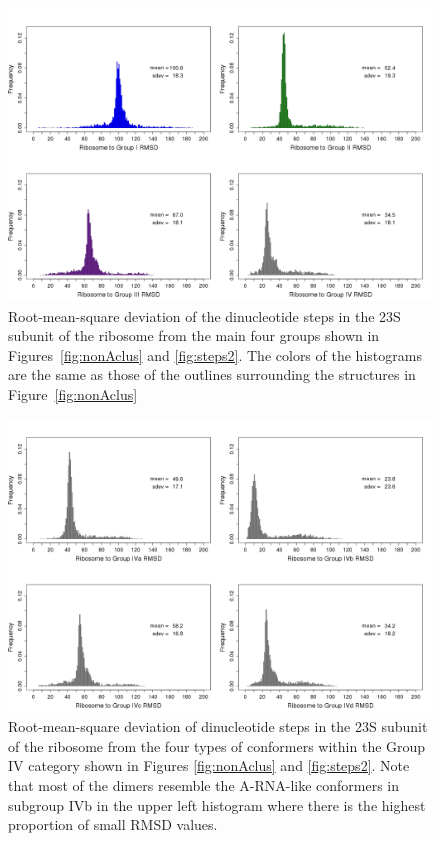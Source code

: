 \begin{figure}[htbp]
 \centering
\includegraphics[angle=90, scale=0.5]{Chapter2/RMSDschneider1.png}
\caption{Root-mean-square deviation  of the dinucleotide  steps in the
  23S  subunit of  the ribosome  from the  main four  groups  shown in
  Figures~\ref{fig:nonAclus} and \ref{fig:steps2}.   The colors of the
  histograms are  the same  as those of  the outlines  surrounding the
  structures in Figure~\ref{fig:nonAclus}}
 \label{fig:histo1}
\end{figure}

\begin{figure}[htbp]
 \centering
\includegraphics[angle=90, scale=0.5]{Chapter2/RMSDschneider2.png}
\caption{Root-mean-square deviation  of dinucleotide steps  in the 23S
  subunit of the ribosome from the four types of conformers within the
  Group   IV  category   shown  in   Figures   \ref{fig:nonAclus}  and
  \ref{fig:steps2}.  Note  that  most   of  the  dimers  resemble  the
  A-RNA-like conformers  in subgroup IVb  in the upper  left histogram
  where there is the highest proportion of small RMSD values.}
 \label{fig:histo2}
\end{figure}

